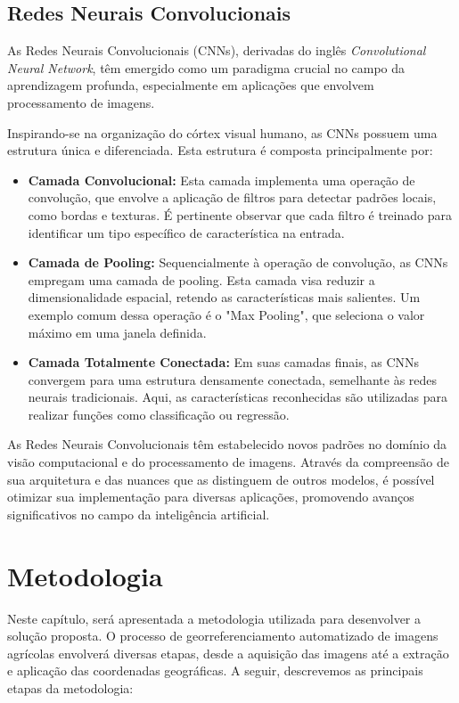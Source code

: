 \documentclass[conference]{IEEEtran}
\begin{document}
\subsection{Redes Neurais Convolucionais}
As Redes Neurais Convolucionais (CNNs), derivadas do inglês \emph{Convolutional Neural Network}, 
têm emergido como um paradigma crucial no campo da aprendizagem profunda, especialmente em aplicações 
que envolvem processamento de imagens.

Inspirando-se na organização do córtex visual humano, as CNNs possuem uma estrutura única e 
diferenciada. Esta estrutura é composta principalmente por:
\begin{itemize}
    \item {\textbf{Camada Convolucional:}}
    Esta camada implementa uma operação de convolução, que envolve a aplicação de filtros para 
    detectar padrões locais, como bordas e texturas. É pertinente observar que cada filtro é treinado 
    para identificar um tipo específico de característica na entrada.

    \item {\textbf{Camada de Pooling:}}
    Sequencialmente à operação de convolução, as CNNs empregam uma camada de pooling. Esta camada 
    visa reduzir a dimensionalidade espacial, retendo as características mais salientes. 
    Um exemplo comum dessa operação é o "Max Pooling", que seleciona o valor máximo em uma janela definida.

    \item {\textbf{Camada Totalmente Conectada:}}
     Em suas camadas finais, as CNNs convergem para uma estrutura densamente conectada, semelhante 
     às redes neurais tradicionais. Aqui, as características reconhecidas são utilizadas para realizar 
     funções como classificação ou regressão.
\end{itemize}

As Redes Neurais Convolucionais têm estabelecido novos padrões no domínio da visão computacional e 
do processamento de imagens. Através da compreensão de sua arquitetura e das nuances que as 
distinguem de outros modelos, é possível otimizar sua implementação para diversas aplicações, 
promovendo avanços significativos no campo da inteligência artificial.

\section{Metodologia}
Neste capítulo, será apresentada a metodologia utilizada para desenvolver a solução proposta. 
O processo de georreferenciamento automatizado de imagens agrícolas envolverá diversas etapas, 
desde a aquisição das imagens até a extração e aplicação das coordenadas geográficas. 
A seguir, descrevemos as principais etapas da metodologia:
\end{document}
